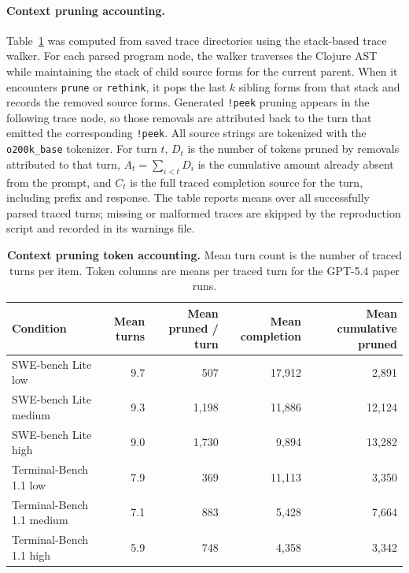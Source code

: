 \paragraph{Context pruning accounting.}
Table~\ref{tab:pruning-token-summary} was computed from saved \Spell{} trace directories using the stack-based trace walker. For each parsed program node, the walker traverses the Clojure AST while maintaining the stack of child source forms for the current parent. When it encounters \lstinline[language=spell]|prune| or \lstinline[language=spell]|rethink|, it pops the last $k$ sibling forms from that stack and records the removed source forms. Generated \lstinline[language=spell]|!peek| pruning appears in the following trace node, so those removals are attributed back to the turn that emitted the corresponding \lstinline[language=spell]|!peek|. All source strings are tokenized with the \texttt{o200k\_base} tokenizer. For turn $t$, $D_t$ is the number of tokens pruned by removals attributed to that turn, $A_t=\sum_{i<t} D_i$ is the cumulative amount already absent from the prompt, and $C_t$ is the full traced completion source for the turn, including prefix and response. The table reports means over all successfully parsed traced turns; missing or malformed traces are skipped by the reproduction script and recorded in its warnings file.

\begin{table}[h]
\centering
\caption{\textbf{Context pruning token accounting.} Mean turn count is the number of traced \Spell{} turns per item. Token columns are means per traced turn for the GPT-5.4 paper runs.}
\label{tab:pruning-token-summary}
\begin{tabular}{lrrrr}
\toprule
Condition & Mean turns & Mean pruned / turn & Mean completion & Mean cumulative pruned \\
\midrule
SWE-bench Lite low & 9.7 & 507 & 17,912 & 2,891 \\
SWE-bench Lite medium & 9.3 & 1,198 & 11,886 & 12,124 \\
SWE-bench Lite high & 9.0 & 1,730 & 9,894 & 13,282 \\
Terminal-Bench 1.1 low & 7.9 & 369 & 11,113 & 3,350 \\
Terminal-Bench 1.1 medium & 7.1 & 883 & 5,428 & 7,664 \\
Terminal-Bench 1.1 high & 5.9 & 748 & 4,358 & 3,342 \\
\bottomrule
\end{tabular}
\end{table}
